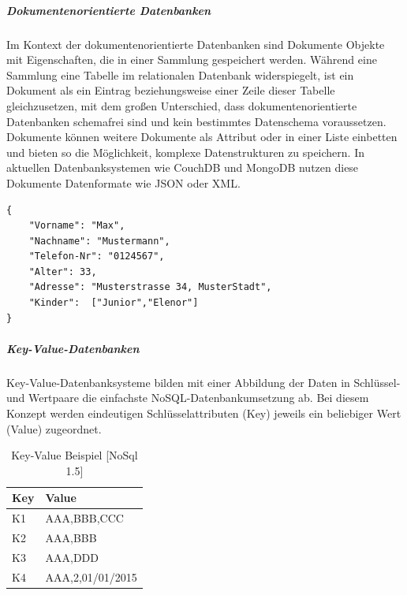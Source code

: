 \subparagraph{Dokumentenorientierte Datenbanken}
Im Kontext der dokumentenorientierte Datenbanken sind Dokumente Objekte mit Eigenschaften, die in einer Sammlung gespeichert werden. 
Während eine Sammlung eine Tabelle im relationalen Datenbank widerspiegelt, ist ein Dokument als ein Eintrag beziehungsweise einer Zeile dieser Tabelle gleichzusetzen, mit dem großen Unterschied, dass dokumentenorientierte Datenbanken schemafrei sind und kein bestimmtes Datenschema voraussetzen. 
Dokumente können weitere Dokumente als Attribut oder in einer Liste einbetten und bieten so die Möglichkeit, komplexe Datenstrukturen zu speichern.  
In aktuellen Datenbanksystemen wie CouchDB und MongoDB nutzen diese Dokumente Datenformate wie JSON oder XML. 

\begin{lstlisting}
{
	"Vorname": "Max",
	"Nachname": "Mustermann",
	"Telefon-Nr": "0124567",
	"Alter": 33,
	"Adresse": "Musterstrasse 34, MusterStadt",
	"Kinder":  ["Junior","Elenor"]
}
\end{lstlisting}


\subparagraph{Key-Value-Datenbanken}
Key-Value-Datenbanksysteme bilden mit einer Abbildung der Daten in Schlüssel- und Wertpaare die einfachste NoSQL-Datenbankumsetzung ab. Bei diesem Konzept werden eindeutigen Schlüsselattributen (Key) jeweils ein beliebiger Wert (Value) zugeordnet. 

\begin{table}[h]
\begin{center}
    \begin{tabular}{| l | p{8cm} |}
    \hline
    \textbf{Key} & \textbf{Value} \\ \hline
    K1 & AAA,BBB,CCC\\
    
    \hline
    K2 &  AAA,BBB\\
    
    \hline
	K3 & AAA,DDD\\
	
    \hline    
    K4 & AAA,2,01/01/2015 \\ 
       \hline  
    \end{tabular}
\end{center}
\caption{Key-Value Beispiel [NoSql 1.5]}
\end{table}


